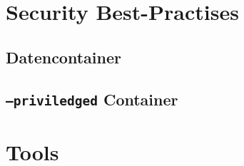 \documentclass[../main.tex]{subfiles}
\begin{document}






  \section{Security Best-Practises}
    \subsection{Datencontainer}

    \subsection{\texttt{--priviledged} Container}

  \section{Tools}
\end{document}
